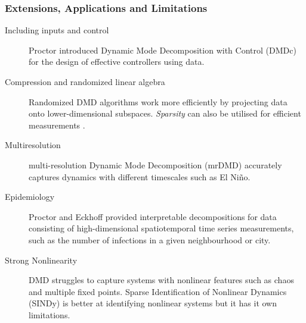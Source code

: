 \subsubsection{Extensions, Applications and Limitations}
\begin{description}
\item[Including inputs and control] Proctor \cite{proctor2014dynamic} introduced Dynamic Mode Decomposition with Control (DMDc) for the design of effective controllers using data.
\item[Compression and randomized linear algebra] Randomized DMD algorithms \cite{Erichson2019} work more efficiently by projecting data onto lower-dimensional subspaces. \emph{Sparsity} can also be utilised for efficient measurements \cite{brunton2021modern}.
\item[Multiresolution] multi-resolution Dynamic Mode Decomposition (mrDMD) \cite{kutz2015multiresolution} accurately captures dynamics with different timescales such as El Ni\~no.
\item[Epidemiology] Proctor and Eckhoff \cite{Proctor2015DiscoveringDP} provided interpretable decompositions for data consisting of high-dimensional spatiotemporal time series measurements, such as the number of infections in a given neighbourhood or city. 
\item[Strong Nonlinearity] DMD struggles to capture systems with nonlinear features such as chaos and multiple fixed points. Sparse Identification of Nonlinear Dynamics (SINDy) \cite{SINDy} is better at identifying nonlinear systems but it has it own limitations.
\end{description}
